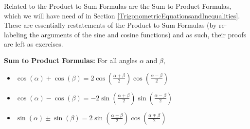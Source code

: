 \documentclass{ximera}
\begin{document}

 

Related to the Product to Sum Formulas are the Sum to Product Formulas, which we will have need of in Section \ref{TrigonometricEquationsandInequalities}.  These are essentially restatements of the Product to Sum Formulas (by re-labeling the arguments of the sine and cosine functions) and as such,  their proofs are left as exercises.

 


\begin{theorem} \label{sumtoproduct}  \textbf{Sum to Product Formulas:} For all angles $\alpha$ and $\beta$, 

\begin{itemize}

\item  $\cos(\alpha) + \cos(\beta) = 2 \cos\left(  \frac{\alpha + \beta}{2}\right)\cos\left(  \frac{\alpha - \beta}{2}\right) $

\item  $\cos(\alpha) -  \cos(\beta) = - 2 \sin\left(  \frac{\alpha + \beta}{2}\right)\sin\left(  \frac{\alpha - \beta}{2}\right) $

\item  $\sin(\alpha) \pm \sin(\beta) = 2 \sin\left(  \frac{\alpha \pm \beta}{2}\right)\cos\left(  \frac{\alpha \mp \beta}{2}\right) $

\end{itemize}

\end{theorem}


 
\end{document}
